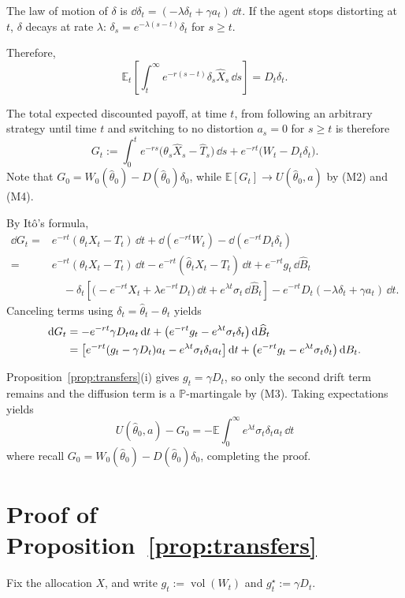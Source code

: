 \documentclass[12pt]{article}
\DeclareMathOperator{\vol}{vol}
\newcommand{\E}{\mathbb{E}}
\newcommand{\hth}{\hat\theta}
\newcommand{\Et}{\mathbb{E}_t}
\begin{document}
The law of motion of $\delta$ is
\(
\dd\delta_t=(-\lambda\delta_t+\gamma a_t)\,\dd t.
\)
If the agent stops distorting at $t$, $\delta$ decays
at rate $\lambda$:
$
  \delta_s=e^{-\lambda(s-t)}\delta_t$ for $s\ge t$.

Therefore,
\[
  \Et\left[\int_t^\infty e^{-r(s-t)}\delta_s\hat{X}_s\,\dd s\right]
  =D_t\delta_t.
\]

The total expected discounted payoff, at time $t$, from following an arbitrary strategy until time $t$ and switching to no distortion $a_s=0$ for $s \geq t$ is therefore 
\[
G_t:=\int_0^t e^{-rs}\big(\theta_s\hat{X}_s-\hat{T}_s\big)\,\dd s
+e^{-rt}\big(W_t-D_t\delta_t\big).
\]
Note that $G_0=W_0(\hth_0)-D(\hth_0)\delta_0$, while
$\E[G_t]\to U(\hth_0,a)$ by (M2) and (M4).

By It\^{o}'s formula, 
\begin{align*}
\dd G_t
={}&
e^{-rt}(\theta_tX_t-T_t)\,\dd t
+\dd(e^{-rt}W_t)
-\dd(e^{-rt}D_t\delta_t)
\\
={}&
e^{-rt}(\theta_tX_t-T_t)\,\dd t
-e^{-rt}(\hth_tX_t-T_t)\,\dd t
+e^{-rt}g_t\,\dd\widehat B_t
\\
&\quad
-\delta_t
\left[
\bigl(-e^{-rt}X_t+\lambda e^{-rt}D_t\bigr)\,\dd t
+e^{\lambda t}\sigma_t\,\dd\widehat B_t
\right]
-e^{-rt}D_t(-\lambda\delta_t+\gamma a_t)\,\dd t.
\end{align*}
Canceling terms using $\delta_t = \hat{\theta}_t-\theta_t$ yields
\begin{align}
\dd G_t
&=-e^{-rt}\gamma D_ta_t\,\dd t
+\bigl(e^{-rt}g_t-e^{\lambda t}\sigma_t\delta_t\bigr)
\,\dd\widehat B_t \notag\\
&=\left[
e^{-rt}(g_t-\gamma D_t)a_t
-e^{\lambda t}\sigma_t\delta_ta_t
\right]\dd t
+\bigl(e^{-rt}g_t-e^{\lambda t}\sigma_t\delta_t\bigr)\,\dd B_t.
\label{eq:general-payoff-dynamics}
\end{align}

Proposition~\ref{prop:transfers}\textnormal{(i)} gives \(g_t=\gamma D_t\), so only the
second drift term remains and the diffusion term is a \(\mathbb P\)-martingale by
(M3). Taking expectations yields
\[
U(\hth_0,a)-G_0
=-\E\int_0^\infty e^{\lambda t}\sigma_t\delta_ta_t\,\dd t
\]
where recall $G_0=W_0(\hth_0)-D(\hth_0)\delta_0$, completing the proof.

\section{Proof of Proposition~\ref{prop:transfers}}
\label{app:proof-transfers}
Fix the allocation \(X\), and write
\(
  g_t:=\vol(W_t)\) and \(
  g_t^\star:= \gamma D_t.
\)
\end{document}
